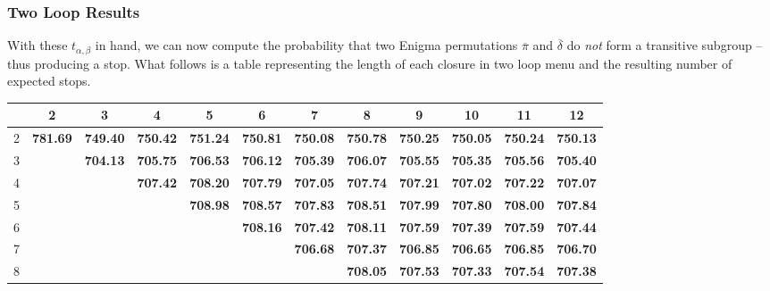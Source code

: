 \subsubsection{Two Loop Results}
With these $t_{\alpha, \beta}$ in hand, we can now compute the
probability that two Enigma permutations $\overline\pi$ and
$\overline\delta$ do \emph{not} form a transitive subgroup -- thus
producing a stop. What follows is a table representing the length of
each closure in two loop menu and the resulting number of expected stops.
\begin{table}[H]
  \centering
  \begin{adjustbox}{max width=\textwidth,max height=2\textheight}
\begin{tabular}{|c|c|c|c|c|c|c|c|c|c|c|c|}
  \hline
  & 2       & 3       & 4       & 5       & 6       & 7       & 8       & 9       & 10      & 11      & 12      \\
  \hline
  2 & \textbf{781.69} & \textbf{749.40} & \textbf{750.42} & \textbf{751.24} & \textbf{750.81} & \textbf{750.08} & \textbf{750.78} & \textbf{750.25} & \textbf{750.05} & \textbf{750.24} & \textbf{750.13} \\
  \hline
  3 &               & \textbf{704.13} & \textbf{705.75} & \textbf{706.53} & \textbf{706.12} & \textbf{705.39} & \textbf{706.07} & \textbf{705.55} & \textbf{705.35} & \textbf{705.56} & \textbf{705.40} \\
  \hline
  4 &               &               & \textbf{707.42} & \textbf{708.20} & \textbf{707.79} & \textbf{707.05} & \textbf{707.74} & \textbf{707.21} & \textbf{707.02} & \textbf{707.22} & \textbf{707.07} \\
  \hline
  5 &               &               &               & \textbf{708.98} & \textbf{708.57} & \textbf{707.83} & \textbf{708.51} & \textbf{707.99} & \textbf{707.80} & \textbf{708.00} & \textbf{707.84} \\
  \hline
  6 &               &               &               &               & \textbf{708.16} & \textbf{707.42} & \textbf{708.11} & \textbf{707.59} & \textbf{707.39} & \textbf{707.59} & \textbf{707.44} \\
  \hline
  7 &               &               &               &               &               & \textbf{706.68} & \textbf{707.37} & \textbf{706.85} & \textbf{706.65} & \textbf{706.85} & \textbf{706.70} \\
  \hline
  8 &               &               &               &               &               &               & \textbf{708.05} & \textbf{707.53} & \textbf{707.33} & \textbf{707.54} & \textbf{707.38} \\

\end{tabular}
\end{adjustbox}
\end{table}
